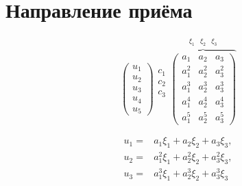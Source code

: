 \chapter{Направление приёма}

\[
    \begin{pmatrix}
        u_1 \\
        u_2 \\
        u_3 \\
        u_4 \\
        u_5
    \end{pmatrix}
    \begin{array}{l}
        c_1 \\
        c_2 \\
        c_3 \\
        \\
        \\
    \end{array}
    \overbrace{
    \begin{pmatrix}
        a_1   & a_2   & a_3   \\
        a_1^2 & a_2^2 & a_3^2 \\
        a_1^3 & a_2^3 & a_3^3 \\
        a_1^4 & a_2^4 & a_3^4 \\
        a_1^5 & a_2^5 & a_3^5
    \end{pmatrix}
    }^{\begin{array}{ccc} \xi_1 & \xi_2 & \xi_3 \end{array}}
\]

\begin{align*}
    u_1 = & a_1 \xi_1 + a_2 \xi_2 + a_3 \xi_3 , \\
    u_2 = & a_1^2 \xi_1 + a_2^2 \xi_2 + a_3^2 \xi_3 , \\
    u_3 = & a_1^3 \xi_1 + a_2^3 \xi_2 + a_3^3 \xi_3 
\end{align*}

